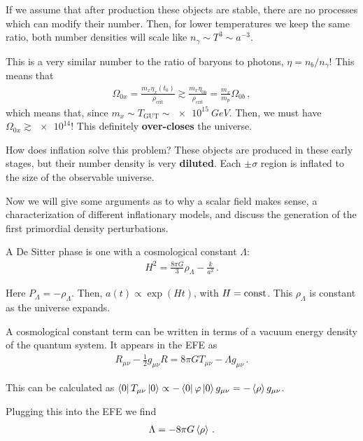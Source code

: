 \documentclass[main.tex]{subfiles}
\begin{document}
If we assume that after production these objects are stable, there are no processes which can modify their number. Then, for lower temperatures we keep the same ratio, both number densities will scale like \(n_\gamma \sim T^3 \sim a^{-3}\). 

This is a very similar number to the ratio of baryons to photons, \(\eta = n_b / n_\gamma \)! 
This means that 
%
\begin{align}
\Omega_{0x} = \frac{m_x \eta _x(t_0 )}{\rho _{\text{crit}}}
\gtrsim \frac{m_x \eta_{0b}}{\rho _{\text{crit}}} = \frac{m_x}{m_p}  \Omega_{0b}
\,,
\end{align}
%
which means that, since \(m_x \sim T _{\text{GUT}} \sim \SI{e15}{GeV}\). 
Then, we must have \(\Omega_{0x} \gtrsim \num{e14}\)! This definitely \textbf{over-closes} the universe.

How does inflation solve this problem? These objects are produced in these early stages, but their number density is very \textbf{diluted}. 
Each \(\pm \sigma \) region is inflated to the size of the observable universe. 

Now we will give some arguments as to why a scalar field makes sense, a characterization of different inflationary models, and discuss the generation of the first primordial density perturbations. 

A De Sitter phase is one with a cosmological constant \(\Lambda \): 
%
\begin{align}
H^2= \frac{8 \pi G}{3} \rho _\Lambda - \frac{k}{a^2}
\,.
\end{align}
 
Here \(P_\Lambda = - \rho _\Lambda \). 
Then, \(a(t) \propto \exp(Ht)\), with \(H = \text{const}\). This \(\rho _\Lambda\) is constant as the universe expands. 

A cosmological constant term can be written in terms of a vacuum energy density of the quantum system. It appears in the EFE as 
%
\begin{align}
R_{\mu \nu } - \frac{1}{2} g_{\mu \nu } R = 8 \pi G T_{\mu \nu } - \Lambda g_{\mu \nu }
\,.
\end{align}

This can be calculated as \(\bra{0} T_{\mu \nu } \ket{0} \propto
 - \bra{0} \varphi \ket{0} g_{\mu \nu }= - \expval{\rho } g_{\mu \nu }\). 
 
Plugging this into the EFE we find 
%
\begin{align}
\Lambda = - 8 \pi G \expval{\rho }
\,.
\end{align}
\end{document}
